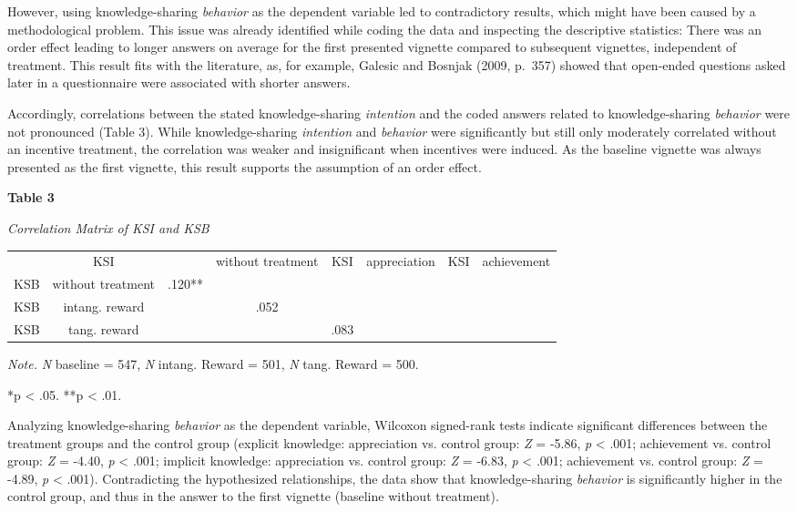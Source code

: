 \documentclass{article}
\begin{document}
However, using knowledge-sharing \emph{behavior} as the dependent variable led to contradictory results, which might have been caused by a methodological problem. This issue was already identified while coding the data and inspecting the descriptive statistics: There was an order effect leading to longer answers on average for the first presented vignette compared to subsequent vignettes, independent of treatment. This result fits with the literature, as, for example, Galesic and Bosnjak (2009, p. 357) showed that open-ended questions asked later in a questionnaire were associated with shorter answers. 

Accordingly, correlations between the stated knowledge-sharing \emph{intention} and the coded answers related to knowledge-sharing \emph{behavior} were not pronounced (Table 3). While knowledge-sharing \emph{intention} and \emph{behavior} were significantly but still only moderately correlated without an incentive treatment, the correlation was weaker and insignificant when incentives were induced. As the baseline vignette was always presented as the first vignette, this result supports the assumption of an order effect. 

\textbf{}

\textbf{Table 3}

\emph{Correlation Matrix of KSI and KSB}


\begin{table}

  
\begin{tabular}{c  c  c  c  c  c  c  c}

   & KSI &   & without treatment & KSI &  appreciation & KSI &  achievement\\
KSB &  without treatment & .120** &  & \\
KSB &  intang. reward &  & .052  & \\
KSB &  tang. reward &  &  & .083 \\


\end{tabular}


\end{table}
\emph{Note.} \emph{N} baseline = 547, \emph{N} intang. Reward = 501, \emph{N} tang. Reward = 500. 

*p < .05. **p < .01.

Analyzing knowledge-sharing \emph{behavior} as the dependent variable, Wilcoxon signed-rank tests indicate significant differences between the treatment groups and the control group (explicit knowledge: appreciation vs. control group: \emph{Z} = -5.86, \emph{p} < .001; achievement vs. control group: \emph{Z} = -4.40, \emph{p} < .001; implicit knowledge: appreciation vs. control group:\emph{ Z} = -6.83, \emph{p} < .001; achievement vs. control group: \emph{Z} = -4.89, \emph{p} < .001). Contradicting the hypothesized relationships, the data show that knowledge-sharing \emph{behavior} is significantly higher in the control group, and thus in the answer to the first vignette (baseline without treatment).
\end{document}
